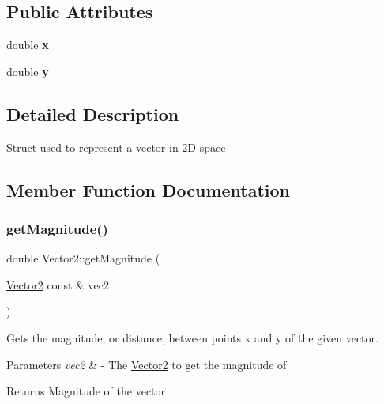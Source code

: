 \subsection*{Public Attributes}
\begin{DoxyCompactItemize}
\item 
\mbox{\label{structVector2_a61d73d9036ccbb3257fbe595c014a1d0}} 
double {\bfseries x}
\item 
\mbox{\label{structVector2_a4df9b2a8e79e6e30a7a3b34722d8b8b8}} 
double {\bfseries y}
\end{DoxyCompactItemize}


\subsection{Detailed Description}
Struct used to represent a vector in 2D space 

\subsection{Member Function Documentation}
\mbox{\label{structVector2_a6fe46469c9fabf6eb2b53b090153bb66}} 
\subsubsection{\texorpdfstring{get\+Magnitude()}{getMagnitude()}}
{\footnotesize\ttfamily double Vector2\+::get\+Magnitude (\begin{DoxyParamCaption}\item[{\hyperlink{structVector2}{Vector2} const \&}]{vec2 }\end{DoxyParamCaption})\hspace{0.3cm}{\ttfamily [static]}}

Gets the magnitude, or distance, between points x and y of the given vector.


\begin{DoxyParams}{Parameters}
{\em vec2} & -\/ The \hyperlink{structVector2}{Vector2} to get the magnitude of \\
\hline
\end{DoxyParams}
\begin{DoxyReturn}{Returns}
Magnitude of the vector 
\end{DoxyReturn}
\mbox{\label{structVector2_a10861942534b8e5179034bd4b7f635ce}} 
